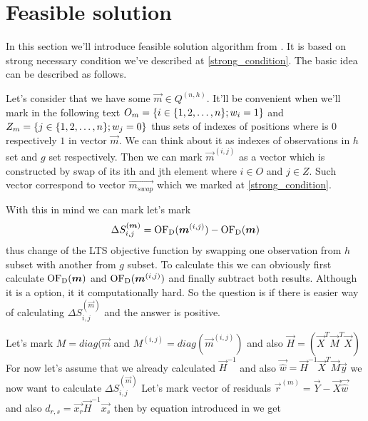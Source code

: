 \section{Feasible solution} \label{section_feasible_solution}
In this section we'll introduce feasible solution algorithm from \cite{hawkins:1994}.
It is based on strong necessary condition we've described at \ref{strong_condition}. 
The basic idea can be described as follows.

Let's consider that we have some $\vec{m} \in Q^{(n,h)}$. It'll be convenient when we'll mark in the following text $O_m = \{{i \in  \{{  1,2,\ldots , n  \}} ;w_i = 1\}}$ and $Z_m = \{{j \in  \{{  1,2,\ldots , n  \}} ;w_j = 0\}}$ thus sets of indexes of positions where is $0$ respectively $1$ in vector $\vec{m}$. We can think about it as indexes of observations in $h$ set and $g$ set respectively. Then we can mark $\vec{m}^{(i,j)}$ as a vector which is constructed by swap of its ith and jth element where $i \in O$ and $j \in Z$. Such vector correspond to vector $\vec{m_{swap}}$ which we marked at \ref{strong_condition}.

With this in mind we can mark let's mark 
\begin{equation}
	\Delta S^{(\boldsymbol{m})}_{i,j} = \operatorname{OF_D}(\boldsymbol{m}^{(i,j)}) - \operatorname{OF_D}(\boldsymbol{m})
\end{equation}
thus change of the LTS objective function by swapping one observation from $h$ subset with another from $g$ subset. To calculate this we can obviously first calculate  $\operatorname{OF_D}(\boldsymbol{m})$ and $ \operatorname{OF_D}(\boldsymbol{m}^{(i,j)})$ and finally subtract both results. Although it is a option, it it computationally hard. So the question is if there is easier way of calculating $\Delta S^{(\vec{m})}_{i,j}$ and the answer is positive. 

Let's mark  
$M = diag(\vec{m}$ and 
$M^(i,j) = diag(\vec{m}^{(i,j)})$ and also
$\vec{H} = (\vec{X}^T\vec{M}^T\vec{X})$
For now let's assume that we already calculated
$\vec{H}^{-1}$ and also $\vec{\hat{w}} = \vec{H}^{-1}\vec{X}^T\vec{M}\vec{y}$
we now want to calculate $\Delta S^{(\vec{m})}_{i,j}$
Let's mark vector of residuals 
$\vec{r}^{(m)} = \vec{Y} - \vec{X} \vec{\hat{w}} $
and also $d_{r,s} = \vec{x_r} \vec{H}^{-1}  \vec{x_s} $
then by equation introduced in \cite{atkinson1991simulated} we get

